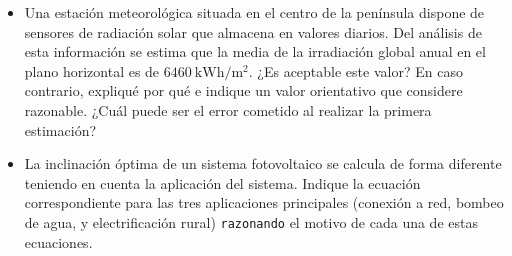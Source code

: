 \documentclass[article, a4paper]{memoir}
\begin{document}
\begin{itemize}
\item Una estación meteorológica situada en el centro de la península
dispone de sensores de radiación solar que almacena en valores
diarios. Del análisis de esta información se estima que la media de
la irradiación global anual en el plano horizontal es de
\(\SI{6460}{\kWh\per\meter\squared}\). ¿Es aceptable este
valor? En caso contrario, expliqué por qué e indique un valor
orientativo que considere razonable. ¿Cuál puede ser el error
cometido al realizar la primera estimación?
\end{itemize}

\begin{itemize}
\item La inclinación óptima de un sistema fotovoltaico se calcula de forma
diferente teniendo en cuenta la aplicación del sistema. Indique la
ecuación correspondiente para las tres aplicaciones principales
(conexión a red, bombeo de agua, y electrificación rural)
\texttt{razonando} el motivo de cada una de estas ecuaciones.
\end{itemize}
\end{document}
